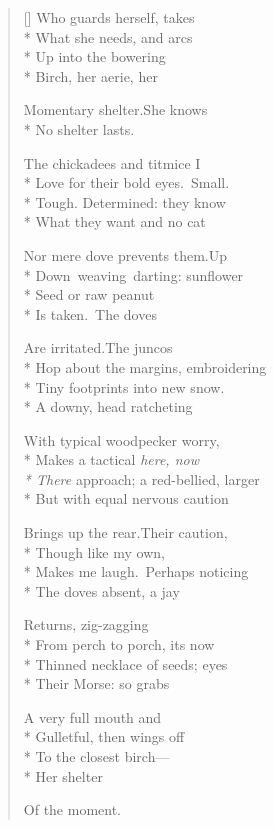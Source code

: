 \begin{verse}[\versewidth]
Who guards herself, takes\\*
What she needs, and arcs\\*
Up into the bowering\\*
Birch, her aerie, her

Momentary shelter.\qquad She knows\\*
No shelter lasts.

The chickadees and titmice I\\*
Love for their bold eyes.\quad Small.\\*
Tough. Determined: they know\\*
What they want and no cat

Nor mere dove prevents them.\quad Up\\*
Down\quad weaving\quad darting: sunflower\\*
Seed or raw peanut\\*
Is taken.\qquad The doves

Are irritated.\qquad The juncos\\*
Hop about the margins, embroidering\\*
Tiny footprints into new snow.\\*
A downy, head ratcheting

With typical woodpecker worry,\\*
Makes a tactical \textit{here, now\\*
There} approach; a red-bellied, larger\\*
But with equal nervous caution

Brings up the rear.\quad Their caution,\\*
Though like my own,\\*
Makes me laugh.\quad Perhaps noticing\\*
The doves absent, a jay

Returns, zig-zagging\\*
From perch to porch, its now\\*
Thinned necklace of seeds; eyes\\*
Their Morse: so grabs

A very full mouth and\\*
Gulletful, then wings off\\*
To the closest birch---\\*
Her shelter

Of the moment.
\end{verse}
